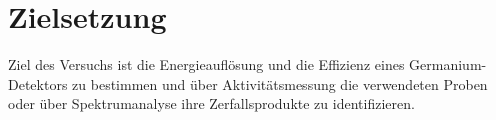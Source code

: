 \section{Zielsetzung}
\label{sec:Zielsetzung}

Ziel des Versuchs ist die Energieauflösung und die Effizienz eines Germanium-Detektors zu bestimmen und über Aktivitätsmessung  die verwendeten Proben oder über Spektrumanalyse ihre Zerfallsprodukte zu identifizieren.